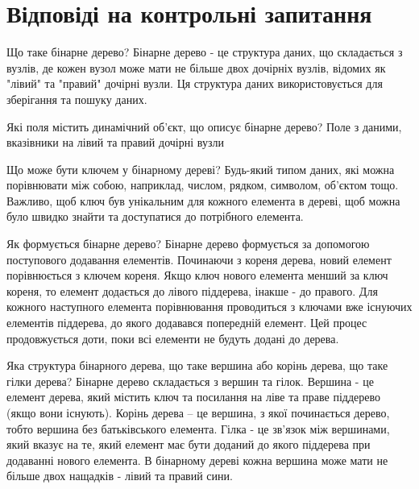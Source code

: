 \documentclass[a4paper, 12pt, oneside]{extarticle}
\begin{document}
\section*{Відповіді на контрольні запитання}
\begin{itemize}
	\question Що таке бінарне дерево?
	\answer Бінарне дерево - це структура даних, що складається з вузлів, де кожен вузол може мати не більше двох дочірніх вузлів, відомих як "лівий" та "правий" дочірні вузли. Ця структура даних використовується для зберігання та пошуку даних.

	\question Які поля містить динамічний об’єкт, що описує бінарне дерево?
	\answer Поле з даними, вказівники на лівий та правий дочірні вузли

	\question Що може бути ключем у бінарному дереві?
	\answer Будь-який типом даних, які можна порівнювати між собою, наприклад, числом, рядком, символом, об'єктом тощо. Важливо, щоб ключ був унікальним для кожного елемента в дереві, щоб можна було швидко знайти та доступатися до потрібного елемента.

	\question Як формується бінарне дерево?
	\answer Бінарне дерево формується за допомогою поступового додавання елементів. Починаючи з кореня дерева, новий елемент порівнюється з ключем кореня. Якщо ключ нового елемента менший за ключ кореня, то елемент додається до лівого піддерева, інакше - до правого. Для кожного наступного елемента порівнювання проводиться з ключами вже існуючих елементів піддерева, до якого додавався попередній елемент. Цей процес продовжується доти, поки всі елементи не будуть додані до дерева.

	\question Яка структура бінарного дерева, що таке вершина або корінь дерева, що таке гілки дерева?
	\answer Бінарне дерево складається з вершин та гілок. Вершина - це елемент дерева, який містить ключ та посилання на ліве та праве піддерево (якщо вони існують). Корінь дерева – це вершина, з якої починається дерево, тобто вершина без батьківського елемента. Гілка - це зв'язок між вершинами, який вказує на те, який елемент має бути доданий до якого піддерева при додаванні нового елемента. В бінарному дереві кожна вершина може мати не більше двох нащадків - лівий та правий сини.
\end{itemize}
\end{document}
